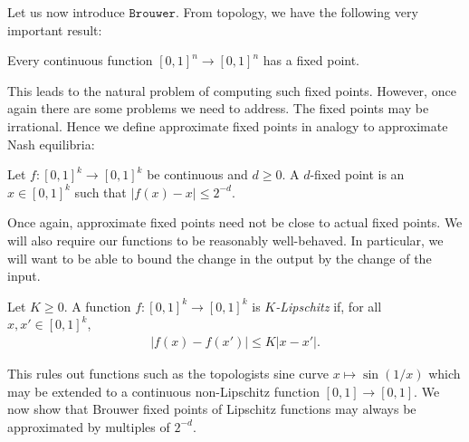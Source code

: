 \documentclass{article}
\begin{document}
Let us now introduce $\texttt{Brouwer}$.
From topology, we have the following very important result:

\begin{theorem}[Brouwer]
  Every continuous function $[0,1]^n\to[0,1]^n$ has a fixed point.
\end{theorem}

This leads to the natural problem of computing such fixed points.
However, once again there are some problems we need to address.
The fixed points may be irrational. Hence we define approximate
fixed points in analogy to approximate Nash equilibria:

\begin{definition}
  Let $f:\left[{0,1}\right]^k \to \left[{0,1}\right]^k$ be continuous and
  $d\geq 0$. A $d$-fixed point is an $x\in\left[{0,1}\right]^k$ such that
  $|f(x)-x|\leq 2^{-d}$.
\end{definition}

Once again, approximate fixed points need not be close to actual fixed
points. We will also require our functions to be reasonably
well-behaved. In particular, we will want to be able to bound the change
in the output by the change of the input.

\begin{definition}
  Let $K\geq 0$. A function $f:\left[{0,1}\right]^k\to\left[{0,1}\right]^k$ is \emph{$K$-Lipschitz} if, for all $x,x'\in\left[{0,1}\right]^k$,
  \begin{align*}
    |f(x)-f(x')| \leq K|x-x'|.
  \end{align*}
\end{definition}

This rules out functions such as the topologists sine curve $x\mapsto\sin(1/x)$ which may be extended to a continuous non-Lipschitz function $\left[{0,1}\right]\to\left[{0,1}\right]$.
We now show that Brouwer fixed points of Lipschitz functions may always be
approximated by multiples of $2^{-d}$.
\end{document}
